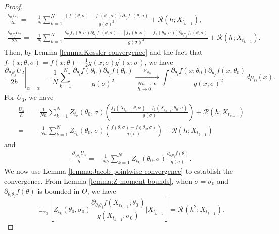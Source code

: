 \documentclass[a4paper,12pt]{article}
\numberwithin{equation}{section}
\theoremstyle{plain}
\theoremstyle{definition}
\begin{document}
\begin{appendix}
\begin{proof}
\begin{align*}
        \frac{\partial_{\theta_i}U_2}{2h}=&\frac{1}{N}\sum_{k=1}^N \frac{\left(f_1(\theta,\sigma)-f_1(\theta_0,\sigma)\right)\partial_{\theta_i}f_1(\theta,\sigma)}{g(\sigma)^2}+\mathcal{R}(h;X_{t_{k-1}}),\\
        \frac{\partial_{\theta_i\theta_j}U_2}{2h}=&\frac{1}{N}\sum_{k=1}^N\frac{\partial_{\theta_i}f_1(\theta,\sigma)\partial_{\theta_j}f_1(\theta,\sigma)+\left[f_1(\theta,\sigma)-f_1(\theta_0,\sigma)\right]\partial_{\theta_i\theta_j}f_1(\theta,\sigma)}{g(\sigma)^2}+\mathcal{R}(h;X_{t_{k-1}}).
    \end{align*}
    Then, by Lemma \ref{lemma:Kessler convergence} and the fact that $f_1(x;\theta,\sigma)=f(x;\theta)-\frac{1}{2}g(x;\sigma)g^\prime(x;\sigma)$, we have 
    \begin{equation}\label{eqn:U_2 theta theta}
        \left.\frac{\partial_{\theta_i\theta_j}U_2}{2h}\right|_{\alpha=\alpha_0}=\frac{1}{N}\sum_{k=1}^N \frac{\partial_{\theta_i}f(\theta_0)\partial_{\theta_j}f(\theta_0)}{g(\sigma)^2}\xrightarrow[\substack{N h\rightarrow\infty \\ h \rightarrow 0}]{\mathbb{P}_{\alpha_0}}\int\frac{\partial_{\theta_i}f(x;\theta_0)\partial_{\theta_j}f(x;\theta_0)}{g(x;\sigma)^2}d\mu_0(x).
    \end{equation}
    For $U_3$, we have 
    \begin{align*}
        \frac{U_3}{h}=&\frac{1}{Nh}\sum_{k=1}^N Z_{t_k}(\theta_0,\sigma)\left(\frac{f_1(X_{t_{k-1}};\theta,\sigma)-f_1(X_{t_{k-1}};\theta_0,\sigma)}{g(\sigma)}\right)+\mathcal{R}(h;X_{t_{k-1}})\\
        =&\frac{1}{Nh}\sum_{k=1}^N Z_{t_k}(\theta_0,\sigma)\left(\frac{f(\theta,\sigma)-f(\theta_0,\sigma)}{g(\sigma)}\right)+\mathcal{R}(h;X_{t_{k-1}})
        \end{align*}
        and
         \begin{align*}\frac{\partial_{\theta_i\theta_j}U_3}{h}=&\frac{1}{Nh}\sum_{k=1}^NZ_{t_k}(\theta_0,\sigma)\frac{\partial_{\theta_i\theta_j}f(\theta)}{g(\sigma)}.
    \end{align*}
We now use Lemma \ref{lemma:Jacob pointwise convergence} to establish the convergence. From Lemma \ref{lemma:Z moment bounds}, when $\sigma=\sigma_0$ and $\partial_{\theta_i\theta_j}f(\theta)$ is bounded in $\Theta$, we have 
    \begin{equation*}
        \mathbb{E}_{\alpha_0}\left[Z_{t_k}(\theta_0,\sigma_0)\frac{\partial_{\theta_i\theta_j}f(X_{t_{k-1}};\theta_0)}{g(X_{t_{k-1}};\sigma_0)}|X_{t_{k-1}}\right]=\mathcal{R}(h^2;X_{t_{k-1}}).

\end{equation*}
\end{proof}
\end{appendix}
\end{document}
